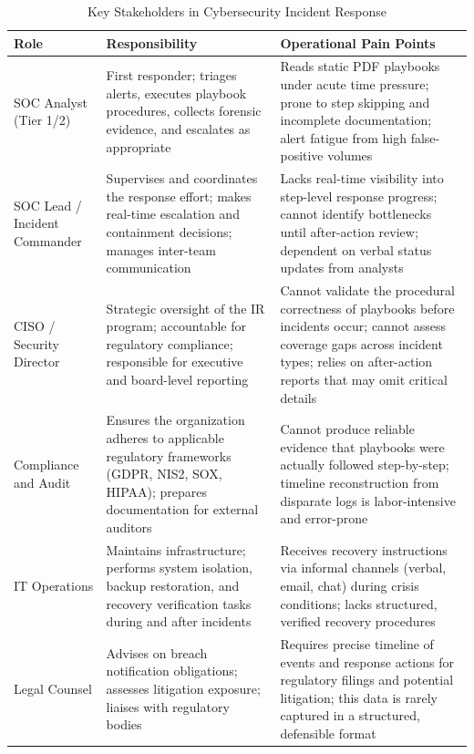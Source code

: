\begin{table}[h!]
\centering
\caption{Key Stakeholders in Cybersecurity Incident Response}
\label{tab:ir_stakeholders}
\begin{tabularx}{\textwidth}{|l|X|X|}
\hline
\textbf{Role} & \textbf{Responsibility} & \textbf{Operational Pain Points} \\
\hline
SOC Analyst (Tier 1/2) &
First responder; triages alerts, executes playbook procedures, collects forensic evidence, and escalates as appropriate &
Reads static PDF playbooks under acute time pressure; prone to step skipping and incomplete documentation; alert fatigue from high false-positive volumes \\
\hline
SOC Lead / Incident Commander &
Supervises and coordinates the response effort; makes real-time escalation and containment decisions; manages inter-team communication &
Lacks real-time visibility into step-level response progress; cannot identify bottlenecks until after-action review; dependent on verbal status updates from analysts \\
\hline
CISO / Security Director &
Strategic oversight of the IR program; accountable for regulatory compliance; responsible for executive and board-level reporting &
Cannot validate the procedural correctness of playbooks before incidents occur; cannot assess coverage gaps across incident types; relies on after-action reports that may omit critical details \\
\hline
Compliance and Audit &
Ensures the organization adheres to applicable regulatory frameworks (GDPR, NIS2, SOX, HIPAA); prepares documentation for external auditors &
Cannot produce reliable evidence that playbooks were actually followed step-by-step; timeline reconstruction from disparate logs is labor-intensive and error-prone \\
\hline
IT Operations &
Maintains infrastructure; performs system isolation, backup restoration, and recovery verification tasks during and after incidents &
Receives recovery instructions via informal channels (verbal, email, chat) during crisis conditions; lacks structured, verified recovery procedures \\
\hline
Legal Counsel &
Advises on breach notification obligations; assesses litigation exposure; liaises with regulatory bodies &
Requires precise timeline of events and response actions for regulatory filings and potential litigation; this data is rarely captured in a structured, defensible format \\
\hline
\end{tabularx}
\end{table}

